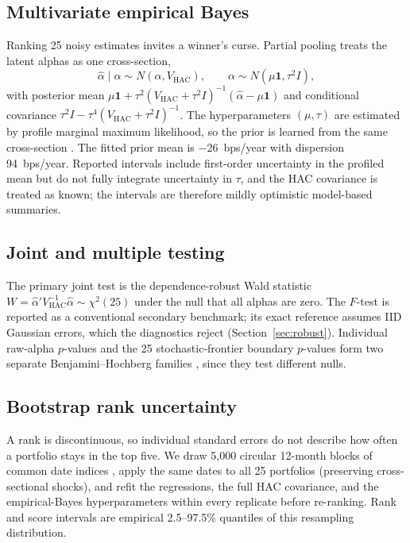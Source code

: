 \documentclass[11pt]{article}
\begin{document}
\subsection{Multivariate empirical Bayes}
Ranking 25 noisy estimates invites a winner's curse. Partial pooling treats the
latent alphas as one cross-section,
\begin{equation}
\hat\alpha\mid\alpha\sim N(\alpha,V_{\mathrm{HAC}}),\qquad
\alpha\sim N(\mu\mathbf{1},\tau^2 I),
\end{equation}
with posterior mean
$\mu\mathbf{1}+\tau^2(V_{\mathrm{HAC}}+\tau^2 I)^{-1}(\hat\alpha-\mu\mathbf{1})$
and conditional covariance
$\tau^2 I-\tau^4(V_{\mathrm{HAC}}+\tau^2 I)^{-1}$. The hyperparameters
$(\mu,\tau)$ are estimated by profile marginal maximum likelihood, so the prior
is learned from the same cross-section \citep{EfronMorris1973,Jorion1986}. The
fitted prior mean is $-26$~bps/year with dispersion 94~bps/year. Reported
intervals include first-order uncertainty in the profiled mean but do not fully
integrate uncertainty in $\tau$, and the HAC covariance is treated as known;
the intervals are therefore mildly optimistic model-based summaries.

\subsection{Joint and multiple testing}
The primary joint test is the dependence-robust Wald statistic
$W=\hat\alpha' V_{\mathrm{HAC}}^{-1}\hat\alpha\sim\chi^2(25)$ under the null
that all alphas are zero. The \citet{GRS1989} $F$-test is reported as a
conventional secondary benchmark; its exact reference assumes IID Gaussian
errors, which the diagnostics reject (Section~\ref{sec:robust}). Individual
raw-alpha $p$-values and the 25 stochastic-frontier boundary $p$-values form
two separate Benjamini--Hochberg families \citep{BenjaminiHochberg1995}, since
they test different nulls.

\subsection{Bootstrap rank uncertainty}
A rank is discontinuous, so individual standard errors do not describe how often
a portfolio stays in the top five. We draw 5,000 circular 12-month blocks of
common date indices \citep{Kunsch1989,PolitisRomano1994}, apply the same dates
to all 25 portfolios (preserving cross-sectional shocks), and refit the
regressions, the full HAC covariance, and the empirical-Bayes hyperparameters
within every replicate before re-ranking. Rank and score intervals are
empirical 2.5--97.5\% quantiles of this resampling distribution.
\end{document}
